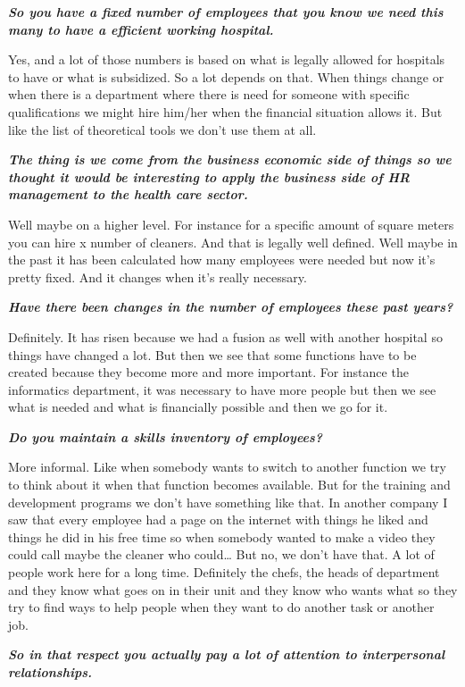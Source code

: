 \documentclass[a4paper,fleqn,11pt,dvips,titlepage]{article}
\newcommand{\question}[1]{\textbf{\textit{#1}}}
\numberwithin{figure}{section}
\numberwithin{equation}{section}
\begin{document}
\question{So you have a fixed number of employees that you know we need this many to have a efficient working hospital. }

Yes, and a lot of those numbers is based on what is legally allowed for hospitals to have or what is subsidized. So a lot depends on that. When things change or when there is a department where there is need for someone with specific qualifications we might hire him/her when the financial situation allows it. But like the list of theoretical tools we don’t use them at all. 

\question{The thing is we come from the business economic side of things so we thought it would be interesting to apply the business side of HR management to the health care sector. }

Well maybe on a higher level. For instance for a specific amount of square meters you can hire x number of cleaners. And that is legally well defined. Well maybe in the past it has been calculated how many employees were needed but now it’s pretty fixed. And it changes when it’s really necessary. 

\question{Have there been changes in the number of employees these past years? }

Definitely. It has risen because we had a fusion as well with another hospital so things have changed a lot. But then we see that some functions have to be created because they become more and more important. For instance the informatics  department, it was necessary to have more people but then we see what is needed and what is financially possible and then we go for it. 

\question{Do you maintain a skills inventory of employees? }

More informal. Like  when somebody wants to switch to another function we try to think about it when that function becomes available. But for the training and development programs we don’t have something like that. In another company I saw that every employee had a page on the internet with things he liked and things he did in his free time so when somebody wanted to make a video they could call maybe the cleaner who could… But no, we don’t have that. A lot of people work here for a long time. Definitely the chefs, the heads of department and they know what goes on in their unit and they know who wants what so they try to find ways to help people when they want to do another task or another job. 

\question{So in that respect you actually pay a lot of attention to interpersonal relationships. }
\end{document}
